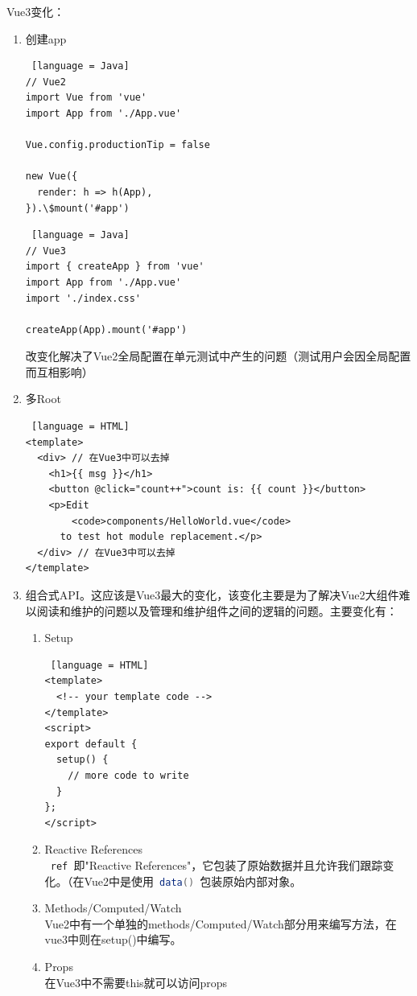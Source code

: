 Vue3变化：
\begin{enumerate}
  \item 创建app
        \begin{lstlisting} [language = Java]
// Vue2
import Vue from 'vue'
import App from './App.vue'

Vue.config.productionTip = false

new Vue({
  render: h => h(App),
}).\$mount('#app')
    \end{lstlisting}
        \begin{lstlisting} [language = Java]
// Vue3
import { createApp } from 'vue'
import App from './App.vue'
import './index.css'

createApp(App).mount('#app')
    \end{lstlisting}
        改变化解决了Vue2全局配置在单元测试中产生的问题（测试用户会因全局配置而互相影响）
  \item 多Root
        \begin{lstlisting} [language = HTML]
<template>
  <div> // 在Vue3中可以去掉
    <h1>{{ msg }}</h1>
    <button @click="count++">count is: {{ count }}</button>
    <p>Edit 
        <code>components/HelloWorld.vue</code> 
      to test hot module replacement.</p>
  </div> // 在Vue3中可以去掉
</template>
\end{lstlisting}
  \item 组合式API。这应该是Vue3最大的变化，该变化主要是为了解决Vue2大组件难以阅读和维护的问题以及管理和维护组件之间的逻辑的问题。主要变化有：
        \begin{enumerate}
          \item Setup
                \begin{lstlisting} [language = HTML]
<template>
  <!-- your template code -->
</template>
<script>
export default {
  setup() {
    // more code to write
  }
};
</script>
            \end{lstlisting}
          \item Reactive References\\
                \lstinline[language = Java]| ref |即"Reactive References"，它包装了原始数据并且允许我们跟踪变化。（在Vue2中是使用\lstinline[language = Java]| data() |包装原始内部对象。
          \item Methods/Computed/Watch\\
                Vue2中有一个单独的methods/Computed/Watch部分用来编写方法，在vue3中则在setup()中编写。
          \item Props\\
                在Vue3中不需要this就可以访问props

\end{enumerate}
\end{enumerate}
